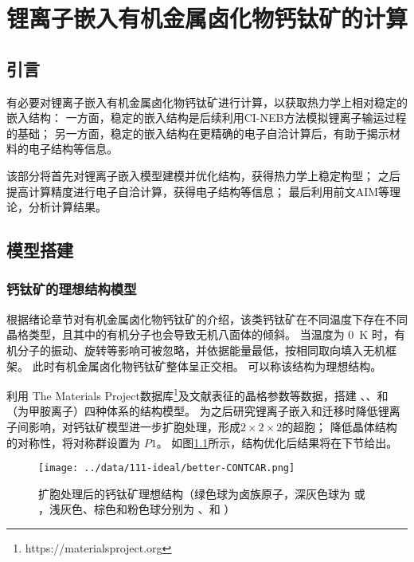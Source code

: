 \chapter{锂离子嵌入有机金属卤化物钙钛矿的计算}

\section{引言}

有必要对锂离子嵌入有机金属卤化物钙钛矿进行计算，以获取热力学上相对稳定的嵌入结构：
一方面，稳定的嵌入结构是后续利用CI-NEB方法模拟锂离子输运过程的基础；
另一方面，稳定的嵌入结构在更精确的电子自洽计算后，有助于揭示材料的电子结构等信息。

该部分将首先对锂离子嵌入模型建模并优化结构，获得热力学上稳定构型；
之后提高计算精度进行电子自洽计算，获得电子结构等信息；
最后利用前文AIM等理论，分析计算结果。

\section{模型搭建}

\subsection{钙钛矿的理想结构模型}

根据绪论章节对有机金属卤化物钙钛矿的介绍，该类钙钛矿在不同温度下存在不同晶格类型，且其中的有机分子也会导致无机八面体的倾斜。
当温度为 \SI{0}{K} 时，有机分子的振动、旋转等影响可被忽略，并依据能量最低，按相同取向填入无机框架。
此时有机金属卤化物钙钛矿整体呈正交相。
可以称该结构为理想结构。

利用 The Materials Project数据库\footnote{https://materialsproject.org}及文献\cite{yinMetalChloridePerovskite2020}表征的晶格参数等数据，搭建 、、和  （为甲胺离子）四种体系的结构模型。
为之后研究锂离子嵌入和迁移时降低锂离子间影响，对钙钛矿模型进一步扩胞处理，形成$2\times2\times2$的超胞；
降低晶体结构的对称性，将对称群设置为 $P1$。
如图\ref{fig:ideal-struc}所示，结构优化后结果将在下节给出。

\begin{figure}[htbp]
    \centering
    \texttt{[image: ../data/111-ideal/better-CONTCAR.png]}
    \caption{扩胞处理后的钙钛矿理想结构（绿色球为卤族原子，深灰色球为 或 ，浅灰色、棕色和粉色球分别为 、和 ）}
    \label{fig:ideal-struc}
\end{figure}

